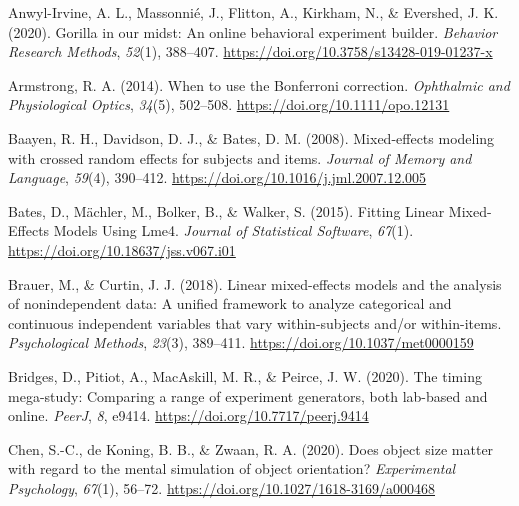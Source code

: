 \documentclass[
  man]{apa6}
\newlength{\cslhangindent}
\newlength{\cslentryspacingunit} %
\newenvironment{CSLReferences}[2] %
 {%
  \setlength{\parindent}{0pt}
  \ifodd #1
  \let\oldpar\par
  \def\par{\hangindent=\cslhangindent\oldpar}
  \fi
  \setlength{\parskip}{#2\cslentryspacingunit}
 }%
 {}
\begin{document}
\hypertarget{refs}{}
\begin{CSLReferences}{1}{0}
\leavevmode{}%
Anwyl-Irvine, A. L., Massonnié, J., Flitton, A., Kirkham, N., \& Evershed, J. K. (2020). Gorilla in our midst: {An} online behavioral experiment builder. \emph{Behavior Research Methods}, \emph{52}(1), 388--407. \url{https://doi.org/10.3758/s13428-019-01237-x}

\leavevmode{}%
Armstrong, R. A. (2014). When to use the {Bonferroni} correction. \emph{Ophthalmic and Physiological Optics}, \emph{34}(5), 502--508. \url{https://doi.org/10.1111/opo.12131}

\leavevmode{}%
Baayen, R. H., Davidson, D. J., \& Bates, D. M. (2008). Mixed-effects modeling with crossed random effects for subjects and items. \emph{Journal of Memory and Language}, \emph{59}(4), 390--412. \url{https://doi.org/10.1016/j.jml.2007.12.005}

\leavevmode{}%
Bates, D., Mächler, M., Bolker, B., \& Walker, S. (2015). Fitting {Linear Mixed}-{Effects Models Using} Lme4. \emph{Journal of Statistical Software}, \emph{67}(1). \url{https://doi.org/10.18637/jss.v067.i01}

\leavevmode{}%
Brauer, M., \& Curtin, J. J. (2018). Linear mixed-effects models and the analysis of nonindependent data: {A} unified framework to analyze categorical and continuous independent variables that vary within-subjects and/or within-items. \emph{Psychological Methods}, \emph{23}(3), 389--411. \url{https://doi.org/10.1037/met0000159}

\leavevmode{}%
Bridges, D., Pitiot, A., MacAskill, M. R., \& Peirce, J. W. (2020). The timing mega-study: Comparing a range of experiment generators, both lab-based and online. \emph{PeerJ}, \emph{8}, e9414. \url{https://doi.org/10.7717/peerj.9414}

\leavevmode{}%
Chen, S.-C., de Koning, B. B., \& Zwaan, R. A. (2020). Does object size matter with regard to the mental simulation of object orientation? \emph{Experimental Psychology}, \emph{67}(1), 56--72. \url{https://doi.org/10.1027/1618-3169/a000468}


\end{CSLReferences}
\end{document}
